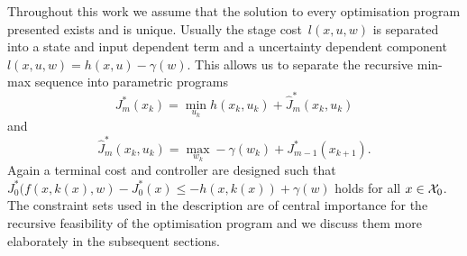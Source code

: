 %
Throughout this work we assume that the solution to every optimisation program presented exists and is unique.
%
Usually the stage cost~$l(x,u,w)$ is separated into a state and input dependent term and a uncertainty dependent component~$l(x,u,w)=h(x,u)-\gamma(w)$.
%
This allows us to separate the recursive min-max sequence into parametric programs
%
\begin{equation}\label{eq:subproblem:abstract:minimisation}
	J_m^\ast(x_k) = \min_{u_k} h(x_k,u_k)+\hat J_m^\ast(x_k,u_k)
\end{equation}
%
and
%
\begin{equation}\label{eq:subproblem:abstract:maximisation}
	\hat J_m^\ast(x_k,u_k) = \max_{w_k} -\gamma(w_k)+J_{m-1}^\ast(x_{k+1}).
\end{equation}
%
Again a terminal cost and controller are designed such that~$J_0^\ast(f(x,k(x),w)-J_0^\ast(x)\leq -h(x,k(x))+\gamma(w)$ holds for all $x\in\mathcal X_0$.
%
The constraint sets used in the description are of central importance for the recursive feasibility of the optimisation program and we discuss them more elaborately in the subsequent sections.
%
%
%
%
